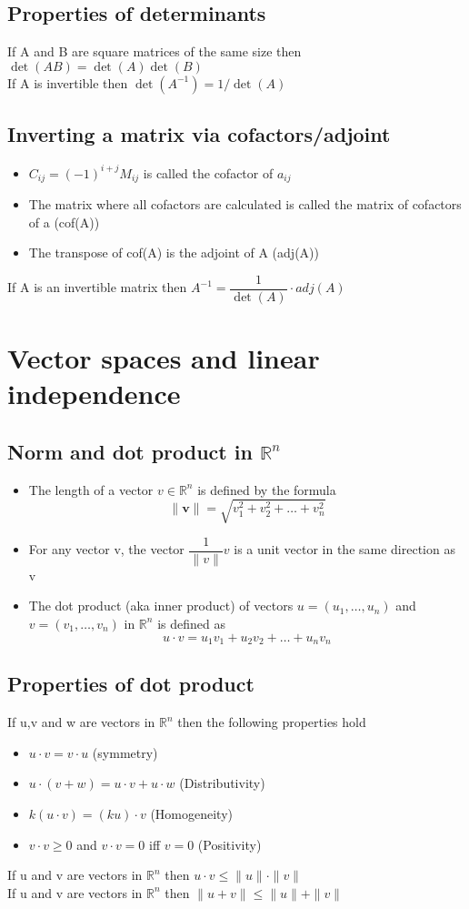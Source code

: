 \documentclass{article}[18pt]
\begin{document}
\subsection{Properties of determinants}
If A and B are square matrices of the same size then $\det(AB)=\det(A)\det(B)$\\
If A is invertible then $\det(A^{-1})=1 / \det(A)$
\subsection{Inverting a matrix via cofactors/adjoint}
\begin{itemize}
	\item $C_{ij}=(-1)^{i+j}M_{ij}$ is called the cofactor of $a_{ij}$
	\item The matrix where all cofactors are calculated is called the matrix of cofactors of a (cof(A))
	\item The transpose of cof(A) is the adjoint of A (adj(A))
\end{itemize}
\begin{center}
	If A is an invertible matrix then $A^{-1}=\dfrac{1}{\det(A)}\cdot adj(A)$
\end{center}
\section{Vector spaces and linear independence}
\subsection{Norm and dot product in $\mathbb{R}^n$}
\begin{itemize}
	\item The length of a vector $v\in \mathbb{R}^n$ is defined by the formula
	\[
	\|\mathbf{v}\|=\sqrt{v_{1}^{2}+v_{2}^{2}+\ldots+v_{n}^{2}}
	\]
	\item For any vector v, the vector $\dfrac{1}{\|v\|}v$ is a unit vector in the same direction as v
	\item The dot product (aka inner product) of vectors $u=(u_1,\ldots,u_n)$ and $v=(v_1,\ldots,v_n)$ in $\mathbb{R}^n$ is defined as
	\[
	u \cdot v=u_{1} v_{1}+u_{2} v_{2}+\ldots+u_{n} v_{n}
	\]
\end{itemize}
\subsection{Properties of dot product}
If u,v and w are vectors in $\mathbb{R}^n$ then the following properties hold
\begin{itemize}
	\item $u\cdot v=v\cdot u$ (symmetry)
	\item $u\cdot(v+w)=u\cdot v+u\cdot w$ (Distributivity)
	\item $k(u\cdot v)=(ku)\cdot v$ (Homogeneity)
	\item $v\cdot v\geqslant 0$ and $v\cdot v=0$ iff $v=0$ (Positivity)
\end{itemize}
If u and v are vectors in $\mathbb{R}^n$ then $u\cdot v\leqslant\|u\|\cdot \|v\|$\\
If u and v are vectors in $\mathbb{R}^n$ then $\|u+v\|\leqslant\|u\|+\|v\|$
\end{document}
